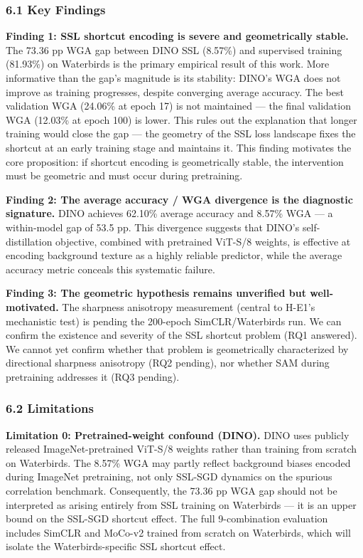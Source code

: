 
\subsubsection{6.1 Key Findings}

\textbf{Finding 1: SSL shortcut encoding is severe and geometrically stable.}
The 73.36 pp WGA gap between DINO SSL (8.57\%) and supervised training (81.93\%) on Waterbirds is the primary empirical result of this work. More informative than the gap's magnitude is its stability: DINO's WGA does not improve as training progresses, despite converging average accuracy. The best validation WGA (24.06\% at epoch 17) is not maintained --- the final validation WGA (12.03\% at epoch 100) is lower. This rules out the explanation that longer training would close the gap --- the geometry of the SSL loss landscape fixes the shortcut at an early training stage and maintains it. This finding motivates the core proposition: if shortcut encoding is geometrically stable, the intervention must be geometric and must occur during pretraining.

\textbf{Finding 2: The average accuracy / WGA divergence is the diagnostic signature.}
DINO achieves 62.10\% average accuracy and 8.57\% WGA --- a within-model gap of 53.5 pp. This divergence suggests that DINO's self-distillation objective, combined with pretrained ViT-S/8 weights, is effective at encoding background texture as a highly reliable predictor, while the average accuracy metric conceals this systematic failure.

\textbf{Finding 3: The geometric hypothesis remains unverified but well-motivated.}
The sharpness anisotropy measurement (central to H-E1's mechanistic test) is pending the 200-epoch SimCLR/Waterbirds run. We can confirm the existence and severity of the SSL shortcut problem (RQ1 answered). We cannot yet confirm whether that problem is geometrically characterized by directional sharpness anisotropy (RQ2 pending), nor whether SAM during pretraining addresses it (RQ3 pending).

\subsubsection{6.2 Limitations}

\textbf{Limitation 0: Pretrained-weight confound (DINO).}
DINO uses publicly released ImageNet-pretrained ViT-S/8 weights rather than training from scratch on Waterbirds. The 8.57\% WGA may partly reflect background biases encoded during ImageNet pretraining, not only SSL-SGD dynamics on the spurious correlation benchmark. Consequently, the 73.36 pp WGA gap should not be interpreted as arising entirely from SSL training on Waterbirds --- it is an upper bound on the SSL-SGD shortcut effect. The full 9-combination evaluation includes SimCLR and MoCo-v2 trained from scratch on Waterbirds, which will isolate the Waterbirds-specific SSL shortcut effect.

